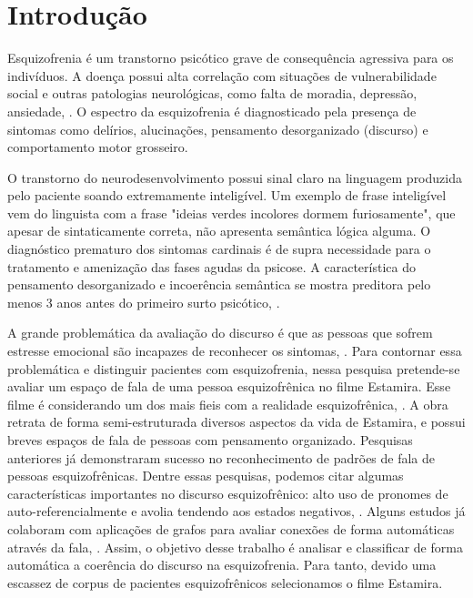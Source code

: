 \documentclass[11pt]{article}
\begin{document}
\section{Introdução}

Esquizofrenia é um transtorno psicótico grave de consequência agressiva para os indivíduos. A doença possui alta correlação com situações de vulnerabilidade social e outras patologias neurológicas, como falta de moradia, depressão, ansiedade, \cite{american2013diagnostic}. O espectro da esquizofrenia é diagnosticado pela presença de sintomas como delírios, alucinações, pensamento desorganizado (discurso) e comportamento motor grosseiro. 

O transtorno do neurodesenvolvimento possui sinal claro na linguagem produzida pelo paciente soando extremamente inteligível. Um exemplo de frase inteligível vem do linguista \cite{chomsky1956three} com a frase "ideias verdes incolores dormem furiosamente", que apesar de sintaticamente correta, não apresenta semântica lógica alguma. O diagnóstico prematuro dos sintomas cardinais é de supra necessidade para o tratamento e amenização das fases agudas da psicose. A característica do pensamento desorganizado e incoerência semântica se mostra preditora pelo menos 3 anos antes do primeiro surto psicótico, \cite{bedi2015automated}.



A grande problemática da avaliação do discurso é que as pessoas que sofrem estresse emocional são incapazes de reconhecer os sintomas, \cite{peralta1998lack}. Para contornar essa problemática e distinguir pacientes com esquizofrenia, nessa pesquisa pretende-se avaliar um espaço de fala de uma pessoa esquizofrênica no filme Estamira. Esse filme é considerando um dos mais fieis com a realidade esquizofrênica, \cite{souza:2008}. A obra retrata de forma semi-estruturada diversos aspectos da vida de Estamira, e possui breves espaços de fala de pessoas com pensamento organizado. Pesquisas anteriores já demonstraram sucesso no reconhecimento de padrões de fala de pessoas esquizofrênicas. Dentre essas pesquisas, podemos citar algumas características importantes no discurso esquizofrênico: alto uso de pronomes de auto-referencialmente e avolia tendendo aos estados negativos, \cite{buck2015differential}. Alguns estudos já colaboram com aplicações de grafos para avaliar conexões de forma automáticas através da fala, \cite{mota2012speech}. Assim, o objetivo desse trabalho é analisar e classificar de forma automática a coerência do discurso na esquizofrenia. Para tanto, devido uma escassez de corpus de pacientes esquizofrênicos selecionamos o filme Estamira.
\end{document}
